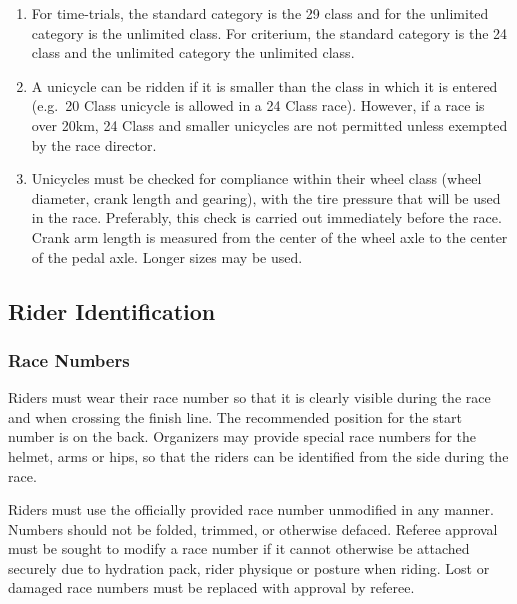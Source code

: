 \begin{enumerate}[leftmargin=1.5em,labelsep=*]
\begin{enumerate}[label*=\arabic*,leftmargin=1.5em,labelsep=*]
		For age group competition, there should be a 20 Class for riders under 11 years old.
		The youngest age group for 24 Class wheels should have a minimum age of 0, so riders 10 years and younger also have the option of racing in the 24 Class 
        (e.g. 0-8 on 20 Class, 9-10 on 20 Class, 0-13 on 24 Class).
	\end{enumerate}
	\item For time-trials, the standard category is the 29 class and for the unlimited category is the unlimited class. 
    For criterium, the standard category is the 24 class and the unlimited category the unlimited class.
	\item A unicycle can be ridden if it is smaller than the class in which it is entered
	(e.g.\ 20 Class unicycle is allowed in a 24 Class race).
	However, if a race is over 20km, 24 Class and smaller unicycles are not permitted unless exempted by the race director.
	\item Unicycles must be checked for compliance within their wheel class (wheel diameter, crank length and gearing), with the tire pressure that will be used in the race.
	Preferably, this check is carried out immediately before the race.
	Crank arm length is measured from the center of the wheel axle to the center of the pedal axle.
	Longer sizes may be used.
\end{enumerate}

\subsection{Rider Identification}
\subsubsection{Race Numbers}
	Riders must wear their race number so that it is clearly visible during the race and when crossing the finish line.
	The recommended position for the start number is on the back.
	Organizers may provide special race numbers for the helmet, arms or hips, so that the riders can be identified from the side during the race.
	
	Riders must use the officially provided race number unmodified in any manner.
	Numbers should not be folded, trimmed, or otherwise defaced.
	Referee approval must be sought to modify a race number if it cannot otherwise be attached securely due to hydration pack, rider physique or posture when riding.
	Lost or damaged race numbers must be replaced with approval by referee.


